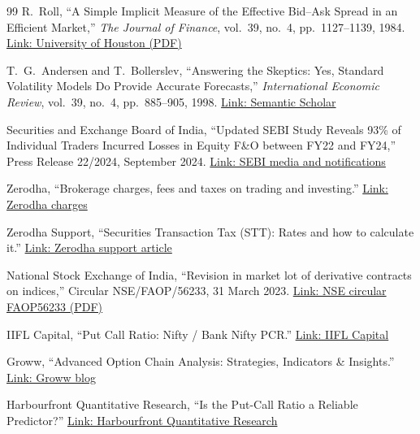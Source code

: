 \documentclass[11pt,a4paper]{article}
\begin{document}
\begin{thebibliography}{99}
 R.~Roll,
``A Simple Implicit Measure of the Effective Bid--Ask Spread in an Efficient Market,''
\emph{The Journal of Finance}, vol.~39, no.~4, pp.~1127--1139, 1984.
\href{https://www.bauer.uh.edu/rsusmel/phd/roll1984.pdf}{Link: University of Houston (PDF)}

 T.~G.~Andersen and T.~Bollerslev,
``Answering the Skeptics: Yes, Standard Volatility Models Do Provide Accurate Forecasts,''
\emph{International Economic Review}, vol.~39, no.~4, pp.~885--905, 1998.
\href{https://www.semanticscholar.org/paper/93ffc319bf39882dd471e1594ce242aee101ef38}{Link: Semantic Scholar}

 Securities and Exchange Board of India,
``Updated SEBI Study Reveals 93\% of Individual Traders Incurred Losses in Equity F\&O
between FY22 and FY24,'' Press Release 22/2024, September 2024.
\href{https://www.sebi.gov.in/media-and-notifications/press-releases/sep-2024/updated-sebi-study-reveals-93-of-individual-traders-incurred-losses-in-equity-fando-between-fy22-and-fy24-aggregate-losses-exceed-1-8-lakh-crores-over-three-years_86906.html}{Link: SEBI media and notifications}

 Zerodha, ``Brokerage charges, fees and taxes on trading and
investing.'' \href{https://zerodha.com/charges/}{Link: Zerodha charges}

 Zerodha Support,
``Securities Transaction Tax (STT): Rates and how to calculate it.''
\href{https://support.zerodha.com/category/account-opening/charges-at-zerodha/statutory-and-exchange/articles/how-is-the-securities-transaction-tax-stt-calculated}{Link: Zerodha support article}

 National Stock Exchange of India,
``Revision in market lot of derivative contracts on indices,''
Circular NSE/FAOP/56233, 31 March 2023.
\href{https://archives.nseindia.com/content/circulars/FAOP56233.pdf}{Link: NSE circular FAOP56233 (PDF)}

 IIFL Capital, ``Put Call Ratio: Nifty / Bank Nifty PCR.''
\href{https://www.indiainfoline.com/markets/derivatives/put-call-ratio}{Link: IIFL Capital}

 Groww, ``Advanced Option Chain Analysis: Strategies, Indicators \&
Insights.'' \href{https://groww.in/blog/advanced-option-chain}{Link: Groww blog}

 Harbourfront Quantitative Research,
``Is the Put-Call Ratio a Reliable Predictor?''
\href{https://harbourfrontquant.substack.com/p/is-the-put-call-ratio-a-reliable}{Link: Harbourfront Quantitative Research}


\end{thebibliography}
\end{document}
